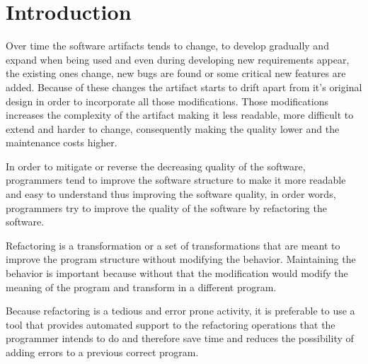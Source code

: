 
% 
% 

\section{Introduction}

Over time the software artifacts tends to change, to develop gradually and expand %
 when being used and even during developing new requirements appear, the existing ones change, new bugs are found or some critical %
  new features are added.
Because of these changes the artifact starts to drift apart from it's original design in order to incorporate all those modifications.
Those modifications increases the complexity of the artifact making it less readable, more difficult to extend and harder to change, consequently making the quality lower and the maintenance costs higher. %


In order to mitigate or reverse the decreasing quality of the software, programmers tend to improve the software structure to make it more readable and easy to understand thus improving the software quality, in order words, programmers try to improve the quality of the software by refactoring the software.

Refactoring is a transformation or a set of transformations that are meant to improve the program structure without modifying the behavior. Maintaining the behavior is important because without that the modification would modify the meaning of the program and transform in a different program.


Because refactoring is a tedious and error prone activity, it is preferable to use a tool that provides automated support to the refactoring operations that the programmer intends to do and therefore save time and reduces the possibility of adding errors to a previous correct program.


